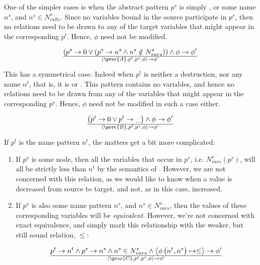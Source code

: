 One of the simpler cases is when the abstract pattern $p^s$ is simply ,
or some name $n^s$, and $n^s\in N_{calls}^s$. Since no variables bound in the
source participate in $p^s$, then no relations need to be drawn to any of the
target variables that might appear in the corresponding $p^t$. Hence, $\phi$
need not be modified.

\begin{equation}\label{eq:sct-pattern-source-fail}
{
\left(
    p^s\rightarrow 0
  \vee
\left(
    p^s\rightarrow n^s
  \wedge
    n^s\notin N_{vars}^s
\right)
\right)
  \wedge
    \phi\rightarrow\phi'
}\over{
  \left\langle\proc{A},p^t,p^s,\phi\right\rangle
  \rightarrow
  \phi'
}
\end{equation}

This has a symmetrical case. Indeed when $p^t$ is neither a destruction, nor
any name $n^t$, that is, it is \mono{\_} or . This pattern contains no
variables, and hence  no relations need to be drawn from any of the variables
that might appear in the corresponding $p^s$. Hence, $\phi$ need not be
modified in such a case either.

\begin{equation}
{
\left(
    p^t\rightarrow 0
\vee
    p^t\rightarrow \_
\right)
  \wedge
    \phi\rightarrow\phi'
}\over{
  \left\langle\proc{B},p^t,p^s,\phi\right\rangle
  \rightarrow
  \phi'
}
\end{equation}

If $p^t$ is the name pattern $n^t$, the matters get a bit more complicated:

\begin{enumerate}

\item If $p^s$ is some node, then all the variables that occur in $p^s$, i.e.
$N_{vars}^s(p^s)$, will all be strictly less than $n^t$ by the semantics of
\D{}. However, we are not concerned with this relation, as we would like to
know when a value is decreased from source to target, and not, as in this case,
increased.

\item If $p^s$ is also some name pattern $n^s$, and  $n^s\in N^s_{vars}$, then
the values of these corresponding variables will be \emph{equivalent}. However,
we're not concerned with exact equivalence, and simply mark this relationship
with the weaker, but still sound relation, $\leq$:

\begin{equation}
{
    p^t\rightarrow n^t
  \wedge
    p^s\rightarrow n^s
  \wedge
    n^s\in N_{vars}^s
  \wedge
    \left\langle\phi\left(n^t, n^s\right)\mapsto \leq\right\rangle\rightarrow\phi'
}\over{
  \left\langle\proc{C},p^t,p^s,\phi\right\rangle
  \rightarrow
  \phi'
}
\end{equation}

\end{enumerate}

